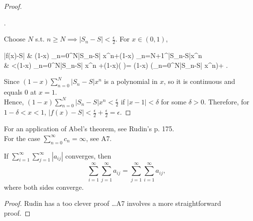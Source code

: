 \begin{thm}
\begin{proof}
\begin{flalign*}
			.\end{flalign*}
		Choose $N$ s.t. $n\ge N \implies \left|S_n-S\right|<\frac{\epsilon}{2} $.
		For $x \in (0,1)$,
		\begin{flalign*}
			\left|f(x)-S\right| & \le (1-x) \sum_{n=0}^{N}{\left|S_n-S\right| x^{n}}+(1-x) \sum_{n=N+1}^{\infty}{\left|S_n-S\right|x^{n}}     \\
			                    & <(1-x) \sum_{n=0}^{N}{\left|S_n-S\right| x^{n}} +(1-x)\left(  \cdot {}\right)=
			(1-x) \left(\sum_{n=0}^{N}{\left|S_n-S\right| x^{n}}\right)+
			.\end{flalign*}
		Since $(1-x)\sum_{n=0}^{N}{\left|S_n-S\right| x^{n}}$ is a polynomial in $x$, so it is continuous and equals $0$ at $x=1$.\\
		Hence, $(1-x)\sum_{n=0}^{N}{\left|S_n-S\right| x^{n}}<\frac{\epsilon}{2}$ if $\left|x-1\right| <\delta$ for some $\delta>0$. Therefore, for $1-\delta<x<1$, $\left|f(x)-S\right|<\frac{\epsilon}{2}+\frac{\epsilon}{2}=\epsilon$.
	\end{proof}
	\begin{note}
		For an application of Abel's theorem, see Rudin's p. 175.\\
		For the case $\sum_{n=0}^{\infty}{c_n}=\infty$, see A7.
	\end{note}
\end{thm}

\begin{thm}[3]
	If $\sum_{i=1}^{\infty}{\sum_{j=1}^{\infty}{\left|a_{ij}\right|}}$ converges, then \[
		\sum_{i=1}^{\infty}{\sum_{j=1}^{\infty}{a_{ij}}}= \sum_{j=1}^{\infty}{\sum_{i=1}^{\infty}{a_{ij}}},\] where both sides converge.
	\begin{proof}
		Rudin has a too clever proof \ldots  A7 involves a more straightforward proof.
	\end{proof}
\end{thm}

